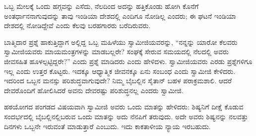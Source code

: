 ಒಬ್ಬ ಮೇಲಕ್ಕೆ ಒಂದು ಹಗ್ಗವನ್ನು ಎಸೆದು, ನೆಲದಿಂದ ಅದನ್ನು ಹತ್ತಿಕೊಂಡು ಹೋಗಿ ಕೊನೆಗೆ ಅಂತರ್ಧಾನನಾಗುವುದನ್ನು ತಾವು ಇಂಡಿಯಾ ದೇಶದಲ್ಲಿ ಎಂದಿಗೂ ನೋಡಿಲ್ಲ ಎಂದರು; ಈ ಘಟನೆ ಇಂಡಿಯಾ ದೇಶದಲ್ಲಿ ನೋಡಿದ್ದೇವೆ ಎಂದು ಕೆಲವು ಬರಹಗಾರರು ಬರೆದಿರುವರು.

ಬಾತ್ಮಿದಾರ ಪ್ರಶ್ನೆ ಹಾಕುತ್ತಿದ್ದಾಗ ಅಲ್ಲಿದ್ದ ಒಬ್ಬ ಮಹಿಳೆಯು ಸ್ವಾಮೀಜಿಯವರನ್ನು, “ನನ್ನನ್ನು ಯಾರೋ ಕೆಲವರು ಸ್ವಾಮೀಜಿಯವರು ಮಾಯಮಂತ್ರಗಳನ್ನು ಮಾಡಬಲ್ಲರೇ? ಸಂಘಕ್ಕೆ ಸೇರುವ ಸಮಯದಲ್ಲಿ ನೆಲದಲ್ಲಿ ಅವರು ಜೀವಸಹಿತ ಹೂಳಲ್ಪಟ್ಟಿದ್ದರೇ?” ಎಂದು ಪ್ರಶ್ನೆ ಮಾಡಿದರು ಎಂದು ಹೇಳಿದಳು. ಸ್ವಾಮೀಜಿಯವರು ಎರಡು ಪ್ರಶ್ನೆಗಳಿಗೂ ಇಲ್ಲ ಎಂದು ಉತ್ತರ ಕೊಟ್ಟರು. ಇದಕ್ಕೂ ಆಧ್ಯಾತ್ಮಿಕ ಜೀವನಕ್ಕೂ ಏನು ಸಂಬಂಧ ಎಂದು ಸ್ವಾಮೀಜಿ ಕೇಳಿದರು. ಇದರಿಂದ ಒಬ್ಬನ ಮನಸ್ಸು ಪರಿಶುದ್ಧವಾಗುವುದೇ? ನಿಮ್ಮ ಬೈಬಲ್ಲಿನ ಸೈತಾನ್​ ಬಹಳ ಪರಾಕ್ರಮಶಾಲಿ. ಆದರೆ ದೇವರೊಂದಿಗೆ ಹೋಲಿಸಿದರೆ ಅವನು ದೇವರಷ್ಟು ಪರಿಶುದ್ಧನಲ್ಲ ಎಂದರು ಸ್ವಾಮೀಜಿ.

ಹಠಯೋಗದ ಪಂಗಡದ ವಿಷಯವಾಗಿ ಸ್ವಾಮೀಜಿ ಅವರು ಒಂದು ಮಾತನ್ನು ಹೇಳಿದರು: ಶಿಷ್ಯನಿಗೆ ದೀಕ್ಷೆ ಕೊಡುವ ಸಂದರ್ಭದಲ್ಲಿ ಬೈಬಲ್ಲಿನಲ್ಲಿಬರುವ ಒಂದು ಮಾತನ್ನು ಅದು ನೆನಪಿಗೆ ತರುವುದು. ಅದೇ ಅವರು ಶಿಷ್ಯನನ್ನು ನಲವತ್ತು ದಿನಗಳು ಒಬ್ಬನೇ ಇರುವಂತೆ ಮಾಡುತ್ತಾರೆ ಎಂಬುದು. ಇದು ಕಾಕತಾಳೀಯ ನ್ಯಾಯ ಇರಬಹುದು.

